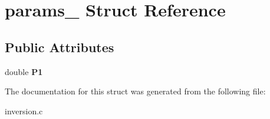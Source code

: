 \hypertarget{structparams__1}{}\section{params\+\_ Struct Reference}
\label{structparams__1}
\subsection*{Public Attributes}
\begin{DoxyCompactItemize}
\item 
\mbox{\label{structparams__1_a795ccca97e3a65fa348e318c67cb7058}} 
double {\bfseries P1}
\end{DoxyCompactItemize}


The documentation for this struct was generated from the following file\+:\begin{DoxyCompactItemize}
\item 
inversion.\+c\end{DoxyCompactItemize}
